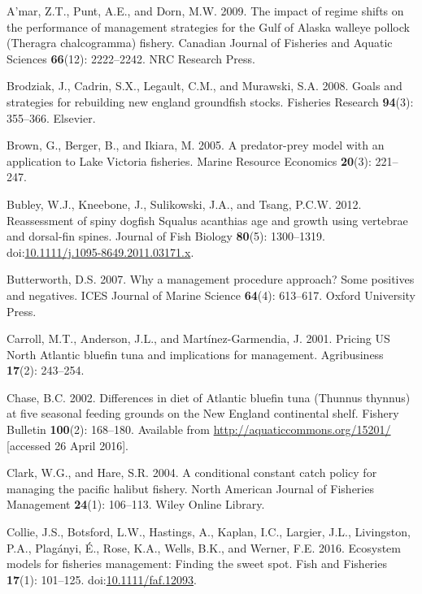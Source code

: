 \documentclass[]{article}
\begin{document}
\hypertarget{ref-Amar2009TheFishery}{}
A'mar, Z.T., Punt, A.E., and Dorn, M.W. 2009. The impact of regime
shifts on the performance of management strategies for the Gulf of
Alaska walleye pollock (Theragra chalcogramma) fishery. Canadian Journal
of Fisheries and Aquatic Sciences \textbf{66}(12): 2222--2242. NRC
Research Press.

\hypertarget{ref-brodziak2008goals}{}
Brodziak, J., Cadrin, S.X., Legault, C.M., and Murawski, S.A. 2008.
Goals and strategies for rebuilding new england groundfish stocks.
Fisheries Research \textbf{94}(3): 355--366. Elsevier.

\hypertarget{ref-Brown2005AFisheries}{}
Brown, G., Berger, B., and Ikiara, M. 2005. A predator-prey model with
an application to Lake Victoria fisheries. Marine Resource Economics
\textbf{20}(3): 221--247.

\hypertarget{ref-bubley_reassessment_2012}{}
Bubley, W.J., Kneebone, J., Sulikowski, J.A., and Tsang, P.C.W. 2012.
Reassessment of spiny dogfish Squalus acanthias age and growth using
vertebrae and dorsal-fin spines. Journal of Fish Biology \textbf{80}(5):
1300--1319.
doi:\href{https://doi.org/10.1111/j.1095-8649.2011.03171.x}{10.1111/j.1095-8649.2011.03171.x}.

\hypertarget{ref-butterworth2007management}{}
Butterworth, D.S. 2007. Why a management procedure approach? Some
positives and negatives. ICES Journal of Marine Science \textbf{64}(4):
613--617. Oxford University Press.

\hypertarget{ref-Carroll2001PricingManagement}{}
Carroll, M.T., Anderson, J.L., and Martínez-Garmendia, J. 2001. Pricing
US North Atlantic bluefin tuna and implications for management.
Agribusiness \textbf{17}(2): 243--254.

\hypertarget{ref-chase_differences_2002}{}
Chase, B.C. 2002. Differences in diet of Atlantic bluefin tuna (Thunnus
thynnus) at five seasonal feeding grounds on the New England continental
shelf. Fishery Bulletin \textbf{100}(2): 168--180. Available from
\url{http://aquaticcommons.org/15201/} {[}accessed 26 April 2016{]}.

\hypertarget{ref-clark2004conditional}{}
Clark, W.G., and Hare, S.R. 2004. A conditional constant catch policy
for managing the pacific halibut fishery. North American Journal of
Fisheries Management \textbf{24}(1): 106--113. Wiley Online Library.

\hypertarget{ref-collie_ecosystem_2016}{}
Collie, J.S., Botsford, L.W., Hastings, A., Kaplan, I.C., Largier, J.L.,
Livingston, P.A., Plagányi, É., Rose, K.A., Wells, B.K., and Werner,
F.E. 2016. Ecosystem models for fisheries management: Finding the sweet
spot. Fish and Fisheries \textbf{17}(1): 101--125.
doi:\href{https://doi.org/10.1111/faf.12093}{10.1111/faf.12093}.
\end{document}
